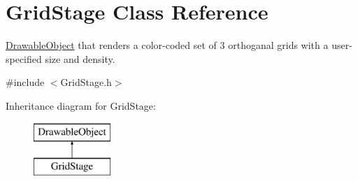 \hypertarget{class_grid_stage}{\section{Grid\-Stage Class Reference}
\label{class_grid_stage}
}


\hyperlink{class_drawable_object}{Drawable\-Object} that renders a color-\/coded set of 3 orthoganal grids with a user-\/specified size and density.  




{\ttfamily \#include $<$Grid\-Stage.\-h$>$}

Inheritance diagram for Grid\-Stage\-:\begin{figure}[H]
\begin{center}
\leavevmode
\includegraphics[height=2.000000cm]{class_grid_stage}
\end{center}
\end{figure}
